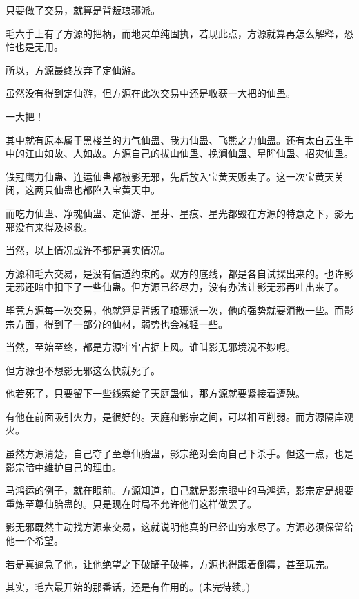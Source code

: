 \begin{this_body}
只要做了交易，就算是背叛琅琊派。

毛六手上有了方源的把柄，而地灵单纯固执，若现此点，方源就算再怎么解释，恐怕也是无用。

所以，方源最终放弃了定仙游。

虽然没有得到定仙游，但方源在此次交易中还是收获一大把的仙蛊。

一大把！

其中就有原本属于黑楼兰的力气仙蛊、我力仙蛊、飞熊之力仙蛊。还有太白云生手中的江山如故、人如故。方源自己的拔山仙蛊、挽澜仙蛊、星眸仙蛊、招灾仙蛊。

铁冠鹰力仙蛊、连运仙蛊都被影无邪，先后放入宝黄天贩卖了。这一次宝黄天关闭，这两只仙蛊也都陷入宝黄天中。

而吃力仙蛊、净魂仙蛊、定仙游、星芽、星痕、星光都毁在方源的特意之下，影无邪没有来得及拯救。

当然，以上情况或许不都是真实情况。

方源和毛六交易，是没有信道约束的。双方的底线，都是各自试探出来的。也许影无邪还暗中扣下了一些仙蛊。但方源已经尽力，没有办法让影无邪再吐出来了。

毕竟方源每一次交易，他就算是背叛了琅琊派一次，他的强势就要消散一些。而影宗方面，得到了一部分的仙材，弱势也会减轻一些。

当然，至始至终，都是方源牢牢占据上风。谁叫影无邪境况不妙呢。

但方源也不想影无邪这么快就死了。

他若死了，只要留下一些线索给了天庭蛊仙，那方源就要紧接着遭殃。

有他在前面吸引火力，是很好的。天庭和影宗之间，可以相互削弱。而方源隔岸观火。

虽然方源清楚，自己夺了至尊仙胎蛊，影宗绝对会向自己下杀手。但这一点，也是影宗暗中维护自己的理由。

马鸿运的例子，就在眼前。方源知道，自己就是影宗眼中的马鸿运，影宗定是想要重炼至尊仙胎蛊的。只是现在时局不允许他们这样做罢了。

影无邪既然主动找方源来交易，这就说明他真的已经山穷水尽了。方源必须保留给他一个希望。

若是真逼急了他，让他绝望之下破罐子破摔，方源也得跟着倒霉，甚至玩完。

其实，毛六最开始的那番话，还是有作用的。(未完待续。)

\end{this_body}


